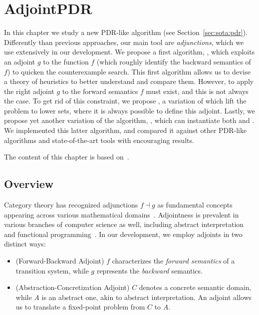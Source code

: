 
\chapter{AdjointPDR}\label{ch:pdr}
In this chapter we study a new PDR-like algorithm (see Section~\ref{sec:sota:pdr}). Differently than previous approaches, our main tool are \emph{adjunctions}, which we use extensively in our development. We propose a first algorithm, \APDR{}, which exploits an adjoint $g$ to the function $f$ (which roughly identify the backward semantics of $f$) to quicken the counterexample search. This first algorithm allows us to devise a theory of heuristics to better understand and compare them.
However, to apply \APDR{} the right adjoint $g$ to the forward semantics $f$ must exist, and this is not always the case. To get rid of this constraint, we propose \ADPDR{}, a variation of \APDR{} which lift the problem to lower sets, where it is always possible to define this adjoint.
Lastly, we propose yet another variation of the algorithm, \APDRAI{}, which can instantiate both \APDR{} and \ADPDR{}. We implemented this latter algorithm, and compared it against other PDR-like algorithms and state-of-the-art tools with encouraging results.

The content of this chapter is based on~\cite{KABBGH23}.

\section{Overview}
Category theory has recognized adjunctions $f \dashv g$ as fundamental concepts appearing across various mathematical domains~\cite{Lawvere69}. Adjointness is prevalent in various branches of computer science as well, including abstract interpretation and functional programming~\cite{Levy2004}. In our development, we employ adjoints in two distinct ways:
\begin{itemize}
	\item (Forward-Backward Adjoint) $f$ characterizes the \emph{forward semantics} of a transition system, while $g$ represents the \emph{backward} semantics.
	\item (Abstraction-Concretization Adjoint) $C$ denotes a concrete semantic domain, while $A$ is an abstract one, akin to abstract interpretation. An adjoint allows us to translate a fixed-point problem from $C$ to $A$.
\end{itemize}

